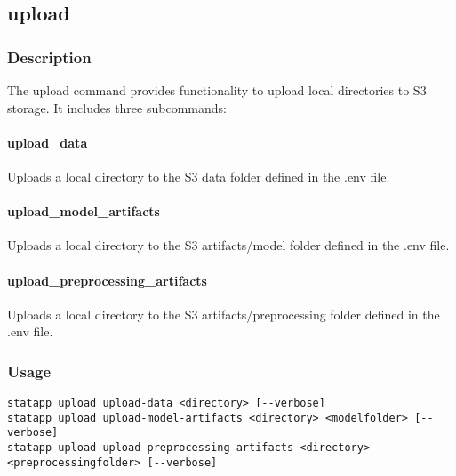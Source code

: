 \documentclass{article}
\begin{document}
\subsection{upload}
\subsubsection{Description}
The upload command provides functionality to upload local directories to S3 storage. It includes three subcommands:

\paragraph{upload\_data}
Uploads a local directory to the S3 data folder defined in the .env file.

\paragraph{upload\_model\_artifacts}
Uploads a local directory to the S3 artifacts/model folder defined in the .env file.

\paragraph{upload\_preprocessing\_artifacts}
Uploads a local directory to the S3 artifacts/preprocessing folder defined in the .env file.

\subsubsection{Usage}
\begin{lstlisting}
statapp upload upload-data <directory> [--verbose]
statapp upload upload-model-artifacts <directory> <modelfolder> [--verbose]
statapp upload upload-preprocessing-artifacts <directory> <preprocessingfolder> [--verbose]
\end{lstlisting}
\end{document}
